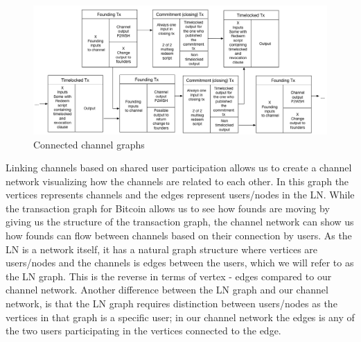 \begin{figure}[h]
    \centering
    \includegraphics[width=14cm]{figures/graph_linking.png}
    \caption{Connected channel graphs}
    \label{fig:linking_graphs}
\end{figure}

Linking channels based on shared user participation allows us to create a channel network visualizing how the channels are related to each other.
In this graph the vertices represents channels and the edges represent users/nodes in the LN.
While the transaction graph for Bitcoin allows us to see how founds are moving by giving us the structure of the transaction graph, 
the channel network can show us how founds can flow between channels based on their connection by users.
As the LN is a network itself, it has a natural graph structure where vertices are users/nodes and the channels is edges between the users, which we will refer to as the LN graph.
This is the reverse in terms of vertex - edges compared to our channel network. Another difference between the LN graph and our channel network, is that the LN graph requires distinction between users/nodes as the vertices in that graph is a specific user; in our channel network the edges is any of the two users participating in the vertices connected to the edge.
\\

